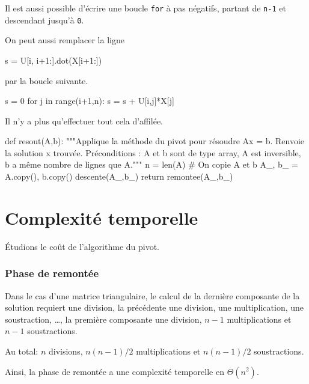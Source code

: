 
\begin{rem}
Il est aussi possible d'écrire une boucle \texttt{for} à pas négatifs, partant de \texttt{n-1} et descendant jusqu'à \texttt{0}.
\end{rem}

\begin{rem}
On peut aussi remplacer la ligne
\begin{pyverbatim}
        s = U[i, i+1:].dot(X[i+1:])
\end{pyverbatim}
par la boucle suivante.
\begin{pyverbatim}
        s = 0
        for j in range(i+1,n):
            s = s + U[i,j]*X[j]
\end{pyverbatim}
\end{rem}

\medskip{}

Il n'y a plus qu'effectuer tout cela d'affilée.
\begin{pyverbatim}
def resout(A,b):
    """Applique la méthode du pivot pour résoudre Ax = b.
    Renvoie la solution x trouvée.
    Préconditions : A et b sont de type array,
                    A est inversible,
                    b a même nombre de lignes que A."""
    n = len(A)
    # On copie A et b
    A_, b_ = A.copy(), b.copy()
    descente(A_,b_)
    return remontee(A_,b_)
\end{pyverbatim}

\section{Complexité temporelle}

\'Etudions le coût de l'algorithme du pivot.

\subsubsection*{Phase de remontée}

  Dans le cas d'une matrice triangulaire, le calcul de la dernière
  composante de la solution requiert une division, la précédente une
  division, une multiplication, une soustraction, \ldots{}, la
  première composante une division, $n-1$ multiplications et $n-1$
  soustractions. 
  
  Au total: $n$ divisions, $n(n-1)/2$ multiplications
  et $n(n-1)/2$ soustractions. 
  
  Ainsi, la phase de remontée a une complexité temporelle en $\Theta(n^{2})$.
  
